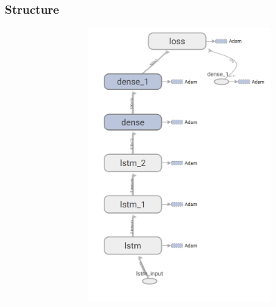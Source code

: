 \subsubsection{Structure}\label{ch:rnn-design}

\begin{figure}
	\centering
	\begin{subfigure}[b]{0.3\linewidth}
		\begin{subfigure}[b]{\linewidth}
			\includegraphics[width=\linewidth]{plots/rnn-candidates-3-lstm-2-dense.png}
		\end{subfigure}
	\end{subfigure}
	\begin{subfigure}[b]{0.3\linewidth}
		\begin{subfigure}[b]{\linewidth}

\end{subfigure}
\end{subfigure}
\end{figure}
